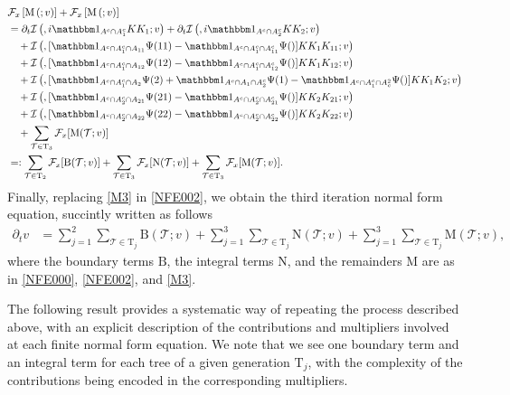 \documentclass[a4paper,
11pt,  reqno]{amsart}
\makeatletter
\newcommand{\5}{\textup{V}}
\newcommand{\ind}{\mathbbm 1}
\newcommand{\dt}{\partial_t}
\theoremstyle{remark}
\newcommand{\TT}{\mathcal{T}}
\newcommand{\Tr}{\mathrm{T}}
\newcommand{\Ft}{{\mathcal{F}}}
\def\<#1>{\csname MH@symb@#1\endcsname}
\newcommand{\Ical}{\mathcal{I}}
\numberwithin{equation}{section}
\numberwithin{theorem}{section}
\newcommand{\MM}{\mathrm{M}}
\newcommand{\NN}{\mathrm{N}}
\newcommand{\BB}{\mathrm{B}}
\makeatother
\begin{document}
\begin{align}
&
 \Ft_x\left[
\MM\left(\<21>;v\right)
\right]
+
 \Ft_x\left[
\MM\left(\<22>;v\right)
\right]
\\
&
=
\dt \Ical\left(\<21>, i \ind_{A^c \cap A_1^c} KK_1 ; v\right)
+
\dt\Ical\left(\<22>, i \ind_{A^c \cap A_2^c} KK_2 ; v\right)
\\
&
\quad
+ \Ical\left( \<31> ,  [\ind_{A^c\cap A_1^c \cap A_{11}} \Psi(11) - \ind_{A^c\cap A_1^c \cap A_{11}^c} \Psi(\<21>) ] KK_1 K_{11}  ; v \right)
\\
&
\quad
+
 \Ical\left( \<32> , [ \ind_{A^c\cap A_1^c \cap A_{12}} \Psi(12) - \ind_{A^c \cap A_1^c \cap A_{12}^c} \Psi(\<21>)  ]KK_1 K_{12}  ; v \right)
\\
&
\quad
+ \Ical\left( \<33> ,  [ \ind_{A^c\cap A_1^c \cap A_{2}} \Psi(2)+ \ind_{A^c \cap A_1 \cap A_2^c} \Psi(1)  - \ind_{A^c \cap A_1^c \cap A^2_c} \Psi(\<1>)] KK_1 K_2    ; v \right)
\\
&
\quad
+ \Ical\left( \<34> , [ \ind_{A^c \cap A_2^c \cap A_{21}} \Psi(21) - \ind_{A^c \cap A_2^c \cap A_{21}^c} \Psi(\<22>) ]K K_2 K_{21}  ; v \right)
\\
&
\quad
+ \Ical\left( \<35> ,[ \ind_{A^c \cap A_2^c \cap A_{22} } \Psi(22) - \ind_{A^c \cap A_2^c \cap A_{22}^c} \Psi(\<22>) ] K K_2 K_{22}    ; v \right)
\\
&
\quad
+ \sum_{\TT\in\Tr_3}
 \Ft_x[
\MM(\TT;v)
]
\\
&
=:
\sum_{\TT\in \Tr_2}
\Ft_x[
\BB(\TT;v)
]
 + \sum_{\TT \in \Tr_3}
 \Ft_x[
\NN(\TT;v)
]
 + \sum_{\TT\in\Tr_3}
 \Ft_x[
\MM(\TT;v)
]
.
\label{M3}
\end{align}
Finally, replacing \eqref{M3} in \eqref{NFE002}, we obtain the third iteration normal form equation, succintly written as follows
\begin{align}
\dt v
&
= \sum_{j=1}^2 \sum_{\TT \in \Tr_j} \BB(\TT ; v)
+
\sum_{j=1}^3 \sum_{\TT\in \Tr_j} \NN(\TT; v)
+
\sum_{j=1}^3 \sum_{\TT\in \Tr_j} \MM(\TT; v),
\end{align}
where the boundary terms $\BB$, the integral terms $\NN$, and the remainders $\MM$ are as in \eqref{NFE000}, \eqref{NFE002}, and \eqref{M3}.





The following result provides a systematic way of repeating the process described above, with an explicit description of the contributions and multipliers involved at each finite normal form equation.
We note that we see one boundary term and an integral term for each tree of a given generation $\Tr_j$, with the complexity of the contributions being encoded in the corresponding multipliers.
\end{document}
